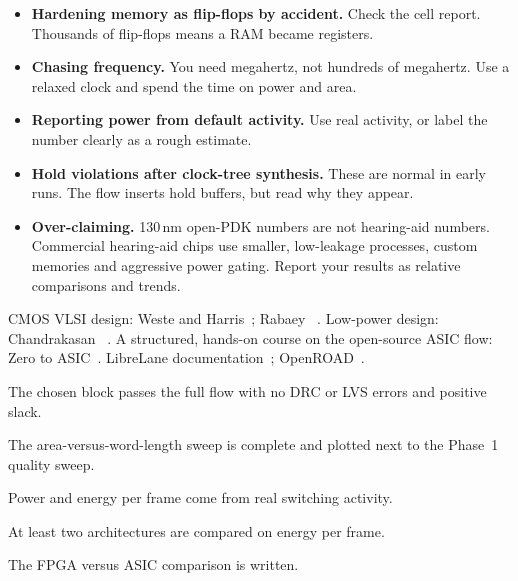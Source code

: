 \begin{pitfallbox}
\begin{itemize}
  \item \textbf{Hardening memory as flip-flops by accident.} Check the cell
        report. Thousands of flip-flops means a RAM became registers.
  \item \textbf{Chasing frequency.} You need megahertz, not hundreds of
        megahertz. Use a relaxed clock and spend the time on power and area.
  \item \textbf{Reporting power from default activity.} Use real activity, or
        label the number clearly as a rough estimate.
  \item \textbf{Hold violations after clock-tree synthesis.} These are normal in
        early runs. The flow inserts hold buffers, but read why they appear.
  \item \textbf{Over-claiming.} 130\,nm open-PDK numbers are not hearing-aid
        numbers. Commercial hearing-aid chips use smaller, low-leakage
        processes, custom memories and aggressive power gating. Report your
        results as relative comparisons and trends.
\end{itemize}
\end{pitfallbox}

\begin{readbox}
CMOS VLSI design: Weste and Harris~\cite{weste2010cmos}; Rabaey
\etal~\cite{rabaey2003digital}. Low-power design:
Chandrakasan \etal~\cite{chandrakasan1992lowpower}. A structured, hands-on
course on the open-source ASIC flow: Zero to ASIC~\cite{ch12-13:zerotoasic}.
LibreLane documentation~\cite{ch12-13:librelanedocs}; OpenROAD~\cite{ajayi2019openroad}.
\end{readbox}

\begin{donebox}
\begin{checklist}
  \item The chosen block passes the full flow with no DRC or LVS errors and positive slack.
  \item The area-versus-word-length sweep is complete and plotted next to the Phase~1 quality sweep.
  \item Power and energy per frame come from real switching activity.
  \item At least two architectures are compared on energy per frame.
  \item The FPGA versus ASIC comparison is written.
\end{checklist}
\end{donebox}
